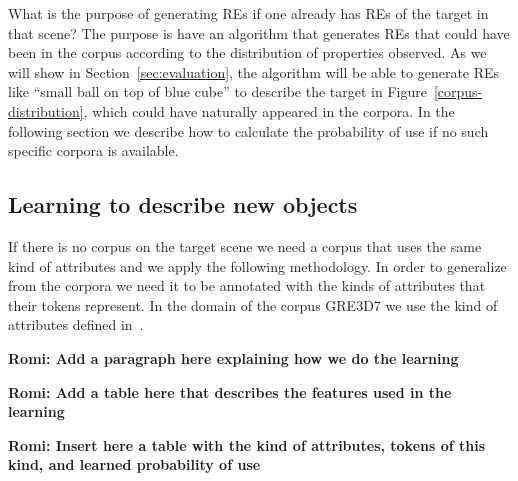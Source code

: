 What is the purpose of generating REs if one already has REs of the target in that scene? The purpose is have an algorithm that generates REs that could have been in the corpus according to the distribution of properties observed. As we will show in Section~\ref{sec:evaluation}, the algorithm will be able to generate REs like ``small ball on top of blue cube'' to describe the target in Figure~\ref{corpus-distribution}, which could have naturally appeared in the corpora. In the following section we describe how to calculate the probability of use if no such specific corpora is available. 

\subsection{Learning to describe new objects}

If there is no corpus on the target scene we need a corpus that uses the same kind of attributes and we apply the following methodology. In order to generalize from the corpora we need it to be annotated with the kinds of attributes that their tokens represent. In the domain of the corpus GRE3D7 we use the kind of attributes defined in~\cite{viet:gene11}. 

\textbf{Romi: Add a paragraph here explaining how we do the learning}

\textbf{Romi: Add a table here that describes the features used in the learning}

\textbf{Romi: Insert here a table with the kind of attributes, tokens of this kind, and learned probability of use}
